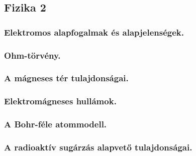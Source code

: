 \subsection{Fizika 2}
\subsubsection{Elektromos alapfogalmak és alapjelenségek.}

\subsubsection{Ohm-törvény.}

\subsubsection{A mágneses tér tulajdonságai. }

\subsubsection{Elektromágneses hullámok. }

\subsubsection{A Bohr-féle atommodell.}

\subsubsection{A radioaktív sugárzás alapvető tulajdonságai.}
